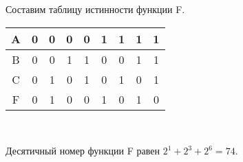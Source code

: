 \documentclass[a4paper,12pt]{report} %
\begin{document}
\newpage
\begin{flushleft}
Составим таблицу истинности функции F. \\

\bigskip

\begin{tabular}{|c|c|c|c|c|c|c|c|c|}
\hline
A &0 &0 &0 &0 &1 &1 &1 &1 \\
\hline
B &0 &0 &1 &1 &0 &0 &1 &1 \\
\hline
C &0 &1 &0 &1 &0 &1 &0 &1 \\
\hline
F &0 & 1 & 0 & 0 & 1 & 0 & 1 & 0 \\
\hline
\end{tabular}
\\
\bigskip

Десятичный номер функции F равен $2^1 + 2^3 + 2^6 = 74$.
\end{flushleft}
\end{document}
